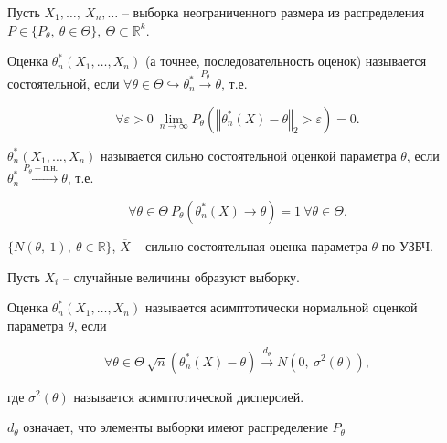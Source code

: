 Пусть $\displaystyle X_{1}, \dotsc,\ X_{n},\dotsc $ -- выборка неограниченного размера из распределения $\displaystyle P\in \{P_{\theta },\ \theta \in \Theta \},\ \Theta \subset \mathbb{R}^{k}$.
\begin{definition}
Оценка $\displaystyle \theta _{n}^{*}( X_{1} ,\dotsc ,X_{n})$ (а точнее, последовательность оценок) называется состоятельной, если $\displaystyle \forall \theta \in \Theta \hookrightarrow \theta _{n}^{*}\xrightarrow{P_{\theta }} \theta $, т.е.


\begin{equation*}
\forall \varepsilon  >0\ \lim _{n\rightarrow \infty } P_{\theta }\left(\left\Vert \theta _{n}^{*}( X) -\theta \right\Vert _{2}  >\varepsilon \right) =0.
\end{equation*}
\end{definition}
\begin{definition}
$\displaystyle \theta _{n}^{*}( X_{1} ,\dotsc ,X_{n})$ называется сильно состоятельной оценкой параметра $\displaystyle \theta $, если $\displaystyle \theta _{n}^{*}\xrightarrow{P_{\theta } -\text{п.н.}} \theta $, т.е.


\begin{equation*}
\displaystyle \forall \theta \in \Theta \ P_{\theta }\left( \theta _{n}^{*}( X)\rightarrow \theta \right) =1\ \forall \theta \in \Theta .
\end{equation*}
\end{definition}
\begin{example}
$\displaystyle \{N( \theta,\ 1),\ \theta \in \mathbb{R}\}$, $\displaystyle \overline{X}$ -- сильно состоятельная оценка параметра $\displaystyle \theta $ по УЗБЧ.
\end{example}
Пусть $\displaystyle X_{i}$ -- случайные величины образуют выборку.
\begin{definition}
Оценка $\displaystyle \theta _{n}^{*}( X_{1} ,\dotsc ,X_{n})$ называется асимптотически нормальной оценкой параметра $\displaystyle \theta $, если

\begin{equation*}
\displaystyle \forall \theta \in \Theta \ \sqrt{n}\left( \theta _{n}^{*}( X) -\theta \right)\xrightarrow{d_{\theta }} N\left( 0,\ \sigma ^{2}( \theta )\right),
\end{equation*}

где $\displaystyle \sigma ^{2}( \theta )$ называется асимптотической дисперсией.
\end{definition}

\begin{note}
$d_{\theta}$ означает, что элементы выборки имеют распределение $P_{\theta}$
\end{note}

